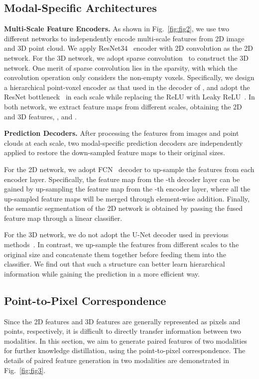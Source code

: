 \documentclass[runningheads]{llncs}
\begin{document}
	

	
	\subsection{Modal-Specific Architectures}
	\label{sec:modal-specific}
	\noindent\textbf{Multi-Scale Feature Encoders.}
	As shown in Fig.~\ref{fig:fig2}, we use two different networks to independently encode multi-scale features from 2D image and 3D point cloud.
We apply ResNet34~\cite{he2016deep} encoder with 2D convolution as the 2D network.
For the 3D network, we adopt sparse convolution~\cite{SparseConv} to construct the 3D network.
One merit of sparse convolution lies in the sparsity, with which the convolution operation only considers the non-empty voxels. 
Specifically, we design a hierarchical point-voxel encoder as that used in the decoder of \cite{tang2020searching}, and adopt the ResNet bottleneck~\cite{he2016deep} in each scale while replacing the ReLU with Leaky ReLU~\cite{maas2013rectifier}.
In both network, we extract  feature maps from different scales, obtaining the 2D and 3D features, \ie,  and .
	
	\noindent\textbf{Prediction Decoders.}
After processing the features from images and point clouds at each scale, two modal-specific prediction decoders are independently applied to restore the down-sampled feature maps to their original sizes.
	
	
	For the 2D network, we adopt FCN~\cite{long2015fully} decoder to up-sample the features from each encoder layer.
Specifically, the feature map  from the -th decoder layer can be gained by up-sampling the feature map from the -th encoder layer, where all the up-sampled feature maps will be merged through element-wise addition.
Finally, the semantic segmentation of the 2D network is obtained by passing the fused feature map through a linear classifier.
	
	For the 3D network, we do not adopt the U-Net decoder used in previous methods~\cite{zhou2020cylinder3d,tang2020searching,cheng20212}.
In contrast, we up-sample the features from different scales to the original size and concatenate them together before feeding them into the classifier.
We find out that such a structure can better learn hierarchical information while gaining the prediction in a more efficient way.
	
	\subsection{Point-to-Pixel Correspondence}
	\label{sec:feat}
	Since the 2D features and 3D features are generally represented as pixels and points, respectively, it is difficult to directly transfer information between two modalities.
In this section, we aim to generate paired features of two modalities for further knowledge distillation, using the point-to-pixel correspondence.
The details of paired feature generation in two modalities are demonstrated in Fig.~\ref{fig:fig3}.
	
\end{document}
